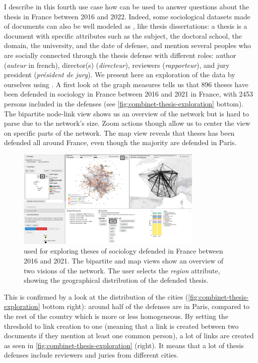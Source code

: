 I describe in this fourth use case how \name can be used to answer questions about the thesis in France between 2016 and 2022.
Indeed, some sociological datasets made of documents can also be well modeled as \modelplural, like thesis dissertations: a thesis is a document with specific attributes such as the subject, the doctoral school, the domain, the university, and the date of defense, and mention several peoples who are socially connected through the thesis defense with different roles: author (\textit{auteur} in french), director(s) (\textit{directeur}), reviewers (\textit{rapporteur}), and jury president (\textit{président de jury}).
We present here an exploration of the data by ourselves using \name.
A first look at the graph measures tells us that 896 theses have been defended in sociology in France between 2016 and 2021 in France, with 2453 persons included in the defenses (see \autoref{fig:combinet-thesis-exploration} bottom).
The bipartite node-link view shows us an overview of the network but is hard to parse due to the network's size.
Zoom actions though allow us to center the view on specific parts of the network.
The map view reveals that theses has been defended all around France, even though the majority are defended in Paris.
\begin{figure}[!ht]
    \centering
    \includegraphics[width=0.8\textwidth]{static/figures/ComBiNet/Thesis-first-exploration}
    \caption{\name used for exploring theses of sociology defended in France between 2016 and 2021. The bipartite and map views show an overview of two visions of the network. The user selects the \textit{region} attribute, showing the geographical distribution of the defended thesis.}\label{fig:combinet-thesis-exploration}
\end{figure}
This is confirmed by a look at the distribution of the cities (\autoref{fig:combinet-thesis-exploration} bottom right): around half of the defenses are in Paris, compared to the rest of the country which is more or less homogeneous.
By setting the threshold to link creation to one (meaning that a link is created between two documents if they mention at least one common person), a lot of links are created as seen in \autoref{fig:combinet-thesis-exploration} (right).
It means that a lot of thesis defenses include reviewers and juries from different cities.

